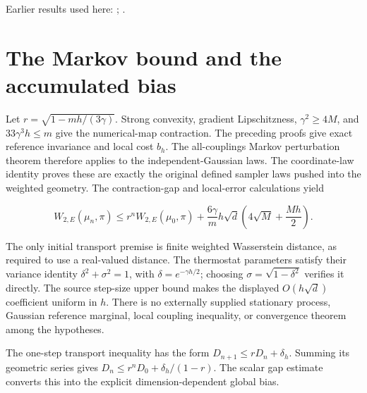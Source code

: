 \documentclass[11pt,a4paper]{article}
\begin{document}
Earlier results used here: \cite[Section~3.33.5]{LangevinLean2026ULASC}; \cite[Section~3.33.6]{LangevinLean2026ULASC}.

\section{\texorpdfstring{The Markov bound and the accumulated bias}{The Markov bound and the accumulated bias}}


Let \(r=\sqrt{1-mh/(3\gamma)}\). Strong convexity, gradient Lipschitzness, \(\gamma^2\ge4M\), and \(33\gamma^3h\le m\) give the numerical-map contraction. The preceding proofs give exact reference invariance and local cost \(b_h\). The all-couplings Markov perturbation theorem therefore applies to the independent-Gaussian laws. The coordinate-law identity proves these are exactly the original defined sampler laws pushed into the weighted geometry. The contraction-gap and local-error calculations yield

\[W_{2,E}(\mu_n,\pi)\le r^nW_{2,E}(\mu_0,\pi)+\frac{6\gamma}{m}h\sqrt d\left(4\sqrt M+\frac{Mh}{2}\right).\]

The only initial transport premise is finite weighted Wasserstein distance, as required to use a real-valued distance. The thermostat parameters satisfy their variance identity \(\delta^2+\sigma^2=1\), with \(\delta=e^{-\gamma h/2}\); choosing \(\sigma=\sqrt{1-\delta^2}\) verifies it directly. The source step-size upper bound makes the displayed \(O(h\sqrt d)\) coefficient uniform in \(h\). There is no externally supplied stationary process, Gaussian reference marginal, local coupling inequality, or convergence theorem among the hypotheses.



The one-step transport inequality has the form \(D_{n+1}\le rD_n+\delta_h\). Summing its geometric series gives \(D_n\le r^nD_0+\delta_h/(1-r)\). The scalar gap estimate converts this into the explicit dimension-dependent global bias.
\end{document}
